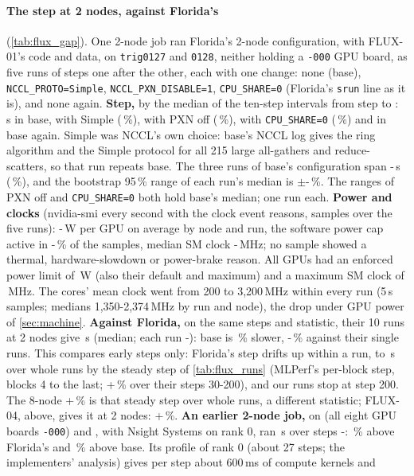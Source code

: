 \paragraph{The step at 2 nodes, against Florida's} (\cref{tab:flux_gap}). One 2-node job ran Florida's 2-node configuration, with FLUX-01's code and data, on \texttt{trig0127} and \texttt{0128}, neither holding a \texttt{-000} GPU board, as five runs of \TriFxGapSteps{} steps one after the other, each with one change: none (base), \texttt{NCCL\_PROTO=Simple}, \texttt{NCCL\_PXN\_DISABLE=1}, \texttt{CPU\_SHARE=0} (Florida's \texttt{srun} line as it is), and none again. \textbf{Step,} by the median of the \TriFxGapIntervals{} ten-step intervals from step \TriFxGapFrom{} to \TriFxGapSteps: \TriFxGapBase\,s in base, \TriFxGapSimple{} with Simple (\TriFxGapSimplePct\,\%), \TriFxGapPxn{} with PXN off (\TriFxGapPxnPct\,\%), \TriFxGapCpu{} with \texttt{CPU\_SHARE=0} (\TriFxGapCpuPct\,\%) and \TriFxGapBaseTwo{} in base again. Simple was NCCL's own choice: base's NCCL log gives the ring algorithm and the Simple protocol for all 215 large all-gathers and reduce-scatters, so that run repeats base. The three runs of base's configuration span \TriFxGapSameLo-\TriFxGapSameHi\,s (\TriFxGapSamePct\,\%), and the bootstrap 95\,\% range of each run's median is $\pm$\TriFxGapBootLo-\TriFxGapBootHi\,\%. The ranges of PXN off and \texttt{CPU\_SHARE=0} both hold base's median; one run each. \textbf{Power and clocks} (nvidia-smi every second with the clock event reasons, \TriFxGapSamples{} samples over the five runs): \TriFxGapPowerLo-\TriFxGapPowerHi\,W per GPU on average by node and run, the software power cap active in \TriFxGapCapLo-\TriFxGapCapHi\,\% of the samples, median SM clock \TriFxGapSmLo-\TriFxGapSmHi\,MHz; no sample showed a thermal, hardware-slowdown or power-brake reason. All \TriFxGapLimitGpus{} GPUs had an enforced power limit of \TriFxGapLimit\,W (also their default and maximum) and a maximum SM clock of \TriFxGapMaxSm\,MHz. The cores' mean clock went from 200 to 3,200\,MHz within every run (5\,s samples; medians 1,350-2,374\,MHz by run and node), the drop under GPU power of \cref{sec:machine}. \textbf{Against Florida,} on the same steps and statistic, their 10 runs at 2 nodes give \TriFxGapFl\,s (median; each run \TriFxGapFlLo-\TriFxGapFlHi): base is \TriFxGapPct\,\% slower, \TriFxGapPctLo-\TriFxGapPctHi\,\% against their single runs. This compares early steps only: Florida's step drifts up within a run, to \TriFxGapFlWhole\,s over whole runs by the steady step of \cref{tab:flux_runs} (MLPerf's per-block step, blocks 4 to the last; +\TriFxGapFlDrift\,\% over their steps 30-200), and our runs stop at step 200. The 8-node +\TriFxStepPct\,\% is that steady step over whole runs, a different statistic; FLUX-04, above, gives it at 2 nodes: +\TriFxTwoStepPct\,\%. \textbf{An earlier 2-node job,} on \texttt{\TriFxGapOneSlowHost} (all eight GPU boards \texttt{-000}) and \texttt{\TriFxGapOneFastHost}, with Nsight Systems on rank 0, ran \TriFxGapOne\,s over steps \TriFxGapFrom-\TriFxGapOneTo: \TriFxGapOnePct\,\% above Florida's and \TriFxGapOneAbove\,\% above base. Its profile of rank 0 (about 27 steps; the implementers' analysis) gives per step about 600\,ms of compute kernels and 